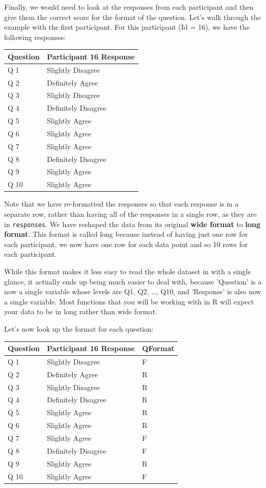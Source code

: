 \documentclass[
  oneside]{book}
\begin{document}
Finally, we would need to look at the responses from each participant and then give them the correct score for the format of the question. Let's walk through the example with the first participant. For this participant (Id = 16), we have the following responses:

\begin{tabular}{l|l}
\hline
Question & Participant 16 Response\\
\hline
Q 1 & Slightly Disagree\\
\hline
Q 2 & Definitely Agree\\
\hline
Q 3 & Slightly Disagree\\
\hline
Q 4 & Definitely Disagree\\
\hline
Q 5 & Slightly Agree\\
\hline
Q 6 & Slightly Agree\\
\hline
Q 7 & Slightly Agree\\
\hline
Q 8 & Definitely Disagree\\
\hline
Q 9 & Slightly Agree\\
\hline
Q 10 & Slightly Agree\\
\hline
\end{tabular}

Note that we have re-formatted the responses so that each response is in a separate row, rather than having all of the responses in a single row, as they are in \texttt{responses}. We have reshaped the data from its original \textbf{wide format} to \textbf{long format}. This format is called long because instead of having just one row for each participant, we now have one row for each data point and so 10 rows for each participant.

While this format makes it less easy to read the whole dataset in with a single glance, it actually ends up being much easier to deal with, because 'Question' is a now a single variable whose levels are Q1, Q2, \ldots, Q10, and 'Response' is also now a single variable. Most functions that you will be working with in R will expect your data to be in long rather than wide format.

Let's now look up the format for each question:

\begin{tabular}{l|l|l}
\hline
Question & Participant 16 Response & QFormat\\
\hline
Q 1 & Slightly Disagree & F\\
\hline
Q 2 & Definitely Agree & R\\
\hline
Q 3 & Slightly Disagree & R\\
\hline
Q 4 & Definitely Disagree & R\\
\hline
Q 5 & Slightly Agree & R\\
\hline
Q 6 & Slightly Agree & R\\
\hline
Q 7 & Slightly Agree & F\\
\hline
Q 8 & Definitely Disagree & F\\
\hline
Q 9 & Slightly Agree & R\\
\hline
Q 10 & Slightly Agree & F\\
\hline
\end{tabular}
\end{document}
